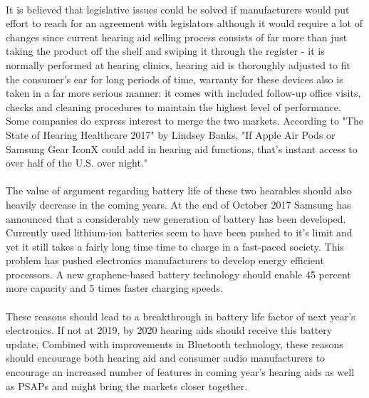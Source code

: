 \paragraph{}
It is believed that legislative issues could be solved if manufacturers would put effort to reach for an agreement with legislators although it would require a lot of changes since current hearing aid selling process consists of far more than just taking the product off the shelf and swiping it through the register - it is normally performed at hearing clinics, hearing aid is thoroughly adjusted to fit the consumer's ear for long periods of time, warranty for these devices also is taken in a far more serious manner: it comes with included follow-up office visits, checks and cleaning procedures to maintain the highest level of performance. Some companies do express interest to merge the two markets. According to "The State of Hearing Healthcare 2017" by Lindsey Banks, "If Apple Air Pods or Samsung Gear IconX could add in hearing aid functions, that’s instant access to over half of the U.S. over night."  
\paragraph{}
The value of argument regarding battery life of these two hearables should also heavily decrease in the coming years. At the end of October 2017 Samsung has announced that a considerably new generation of battery has been developed. Currently used lithium-ion batteries seem to have been pushed to it's limit  and yet it still takes a fairly long time time to charge in a fast-paced society. This problem has pushed electronics manufacturers to develop energy efficient processors. A new graphene-based battery technology should enable 45 percent more capacity and 5 times faster charging speeds.
\paragraph{}
These reasons should lead to a breakthrough in battery life factor of next year's electronics. If not at 2019, by 2020 hearing aids should receive this battery update. Combined with improvements in Bluetooth technology, these reasons should encourage both hearing aid and consumer audio manufacturers to encourage an increased number of features in coming year's hearing aids as well as PSAPs and might bring the markets closer together. 
   


